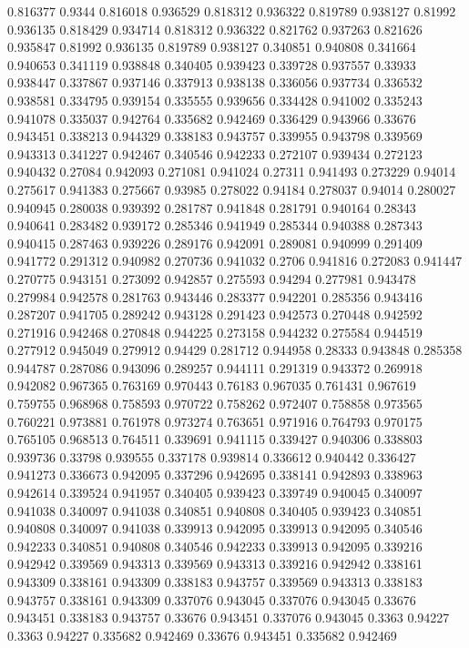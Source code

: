 0.816377 0.9344
0.816018 0.936529
0.818312 0.936322
0.819789 0.938127
0.81992 0.936135
0.818429 0.934714
0.818312 0.936322
0.821762 0.937263
0.821626 0.935847
0.81992 0.936135
0.819789 0.938127
0.340851 0.940808
0.341664 0.940653
0.341119 0.938848
0.340405 0.939423
0.339728 0.937557
0.33933 0.938447
0.337867 0.937146
0.337913 0.938138
0.336056 0.937734
0.336532 0.938581
0.334795 0.939154
0.335555 0.939656
0.334428 0.941002
0.335243 0.941078
0.335037 0.942764
0.335682 0.942469
0.336429 0.943966
0.33676 0.943451
0.338213 0.944329
0.338183 0.943757
0.339955 0.943798
0.339569 0.943313
0.341227 0.942467
0.340546 0.942233
0.272107 0.939434
0.272123 0.940432
0.27084 0.942093
0.271081 0.941024
0.27311 0.941493
0.273229 0.94014
0.275617 0.941383
0.275667 0.93985
0.278022 0.94184
0.278037 0.94014
0.280027 0.940945
0.280038 0.939392
0.281787 0.941848
0.281791 0.940164
0.28343 0.940641
0.283482 0.939172
0.285346 0.941949
0.285344 0.940388
0.287343 0.940415
0.287463 0.939226
0.289176 0.942091
0.289081 0.940999
0.291409 0.941772
0.291312 0.940982
0.270736 0.941032
0.2706 0.941816
0.272083 0.941447
0.270775 0.943151
0.273092 0.942857
0.275593 0.94294
0.277981 0.943478
0.279984 0.942578
0.281763 0.943446
0.283377 0.942201
0.285356 0.943416
0.287207 0.941705
0.289242 0.943128
0.291423 0.942573
0.270448 0.942592
0.271916 0.942468
0.270848 0.944225
0.273158 0.944232
0.275584 0.944519
0.277912 0.945049
0.279912 0.94429
0.281712 0.944958
0.28333 0.943848
0.285358 0.944787
0.287086 0.943096
0.289257 0.944111
0.291319 0.943372
0.269918 0.942082
0.967365 0.763169
0.970443 0.76183
0.967035 0.761431
0.967619 0.759755
0.968968 0.758593
0.970722 0.758262
0.972407 0.758858
0.973565 0.760221
0.973881 0.761978
0.973274 0.763651
0.971916 0.764793
0.970175 0.765105
0.968513 0.764511
0.339691 0.941115
0.339427 0.940306
0.338803 0.939736
0.33798 0.939555
0.337178 0.939814
0.336612 0.940442
0.336427 0.941273
0.336673 0.942095
0.337296 0.942695
0.338141 0.942893
0.338963 0.942614
0.339524 0.941957
0.340405 0.939423
0.339749 0.940045
0.340097 0.941038
0.340097 0.941038
0.340851 0.940808
0.340405 0.939423
0.340851 0.940808
0.340097 0.941038
0.339913 0.942095
0.339913 0.942095
0.340546 0.942233
0.340851 0.940808
0.340546 0.942233
0.339913 0.942095
0.339216 0.942942
0.339569 0.943313
0.339569 0.943313
0.339216 0.942942
0.338161 0.943309
0.338161 0.943309
0.338183 0.943757
0.339569 0.943313
0.338183 0.943757
0.338161 0.943309
0.337076 0.943045
0.337076 0.943045
0.33676 0.943451
0.338183 0.943757
0.33676 0.943451
0.337076 0.943045
0.3363 0.94227
0.3363 0.94227
0.335682 0.942469
0.33676 0.943451
0.335682 0.942469
